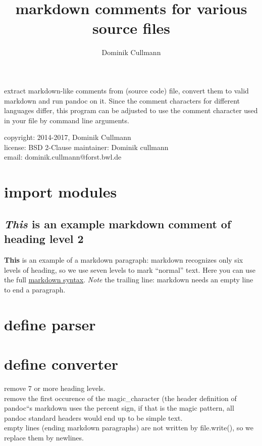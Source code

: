 \documentclass[]{article}
\title{markdown comments for various source files}
\author{Dominik Cullmann}
\begin{document}
\maketitle

extract markdown-like comments from (source code) file, convert them to
valid markdown and run pandoc on it. Since the comment characters for
different languages differ, this program can be adjusted to use the
comment character used in your file by command line arguments.

copyright: 2014-2017, Dominik Cullmann\\license: BSD 2-Clause
maintainer: Dominik cullmann\\email: dominik.cullmann@forst.bwl.de

\section{import modules}\label{import-modules}

\subsection{\emph{This} is an example markdown comment of heading level
2}\label{this-is-an-example-markdown-comment-of-heading-level-2}

\textbf{This} is an example of a markdown paragraph: markdown recognizes
only six levels of heading, so we use seven levels to mark ``normal''
text. Here you can use the full
\href{http://daringfireball.net/projects/markdown/syntax}{markdown
syntax}. \emph{Note} the trailing line: markdown needs an empty line to
end a paragraph.

\section{define parser}\label{define-parser}

\section{define converter}\label{define-converter}

remove 7 or more heading levels.\\remove the first occurence of the
magic\_character (the header definition of pandoc``s markdown uses the
percent sign, if that is the magic pattern, all pandoc standard headers
would end up to be simple text.\\empty lines (ending markdown
paragraphs) are not written by file.write(), so we replace them by
newlines.
\end{document}
